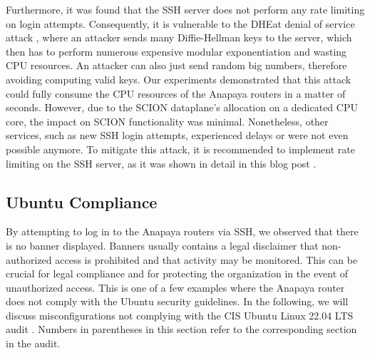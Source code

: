 Furthermore, it was found that the SSH server does not perform any rate limiting on login attempts.
Consequently, it is vulnerable to the DHEat denial of service attack \cite{dheatAttack}, where an attacker sends many Diffie-Hellman keys to the server, which then has to perform numerous expensive modular exponentiation and wasting CPU resources.
An attacker can also just send random big numbers, therefore avoiding computing valid keys.
Our experiments demonstrated that this attack could fully consume the CPU resources of the Anapaya routers in a matter of seconds.
However, due to the SCION dataplane's allocation on a dedicated CPU core, the impact on SCION functionality was minimal.
Nonetheless, other services, such as new SSH login attempts, experienced delays or were not even possible anymore.
To mitigate this attack, it is recommended to implement rate limiting on the SSH server, as it was shown in detail in this blog post \cite{dheatAnalysis}.


\subsection{Ubuntu Compliance}
By attempting to log in to the Anapaya routers via SSH, we observed that there is no banner displayed.
Banners usually contains a legal disclaimer that non-authorized access is prohibited and that activity may be monitored.
This can be crucial for legal compliance and for protecting the organization in the event of unauthorized access.
This is one of a few examples where the Anapaya router does not comply with the Ubuntu security guidelines.
In the following, we will discuss misconfigurations not complying with the CIS Ubuntu Linux 22.04 LTS audit \cite{cisUbuntuLinux2204LTS}.
Numbers in parentheses in this section refer to the corresponding section in the audit.

